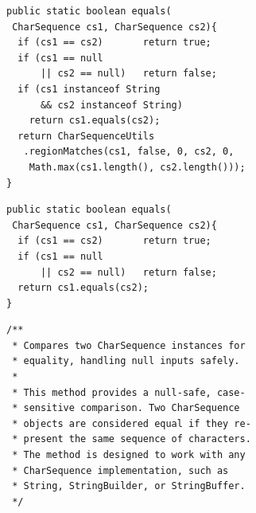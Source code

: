 \documentclass[acmsmall]{acmart}
\newcommand{\hlRange}[2]{%
  \ifnum\value{lstnumber}<#1 \else
  \ifnum\value{lstnumber}>#2 \else
    \color{bvfHL}%
  \fi\fi
}
\begin{document}
\begin{figure}[htbp!]
\vspace{-0.6em}
\centering
\begin{minipage}{1.00\textwidth}

\begin{minipage}[t]{0.333\linewidth}
\begin{tcolorbox}[fixedbox, title=Bug-free method,
                  equal height group=row1]
\begin{lstlisting}[style=codeTiny,
    linebackgroundcolor={\hlRange{6}{11}}]
public static boolean equals(
 CharSequence cs1, CharSequence cs2){
  if (cs1 == cs2)       return true;
  if (cs1 == null
      || cs2 == null)   return false;
  if (cs1 instanceof String
      && cs2 instanceof String)
    return cs1.equals(cs2);
  return CharSequenceUtils
   .regionMatches(cs1, false, 0, cs2, 0, 
    Math.max(cs1.length(), cs2.length()));
}
\end{lstlisting}
\end{tcolorbox}
\end{minipage}%
\hfill
\begin{minipage}[t]{0.310\linewidth}
\begin{tcolorbox}[buggybox, title=Buggy method,
                  equal height group=row1]
\begin{lstlisting}[style=codeTiny,
    linebackgroundcolor={\hlRange{6}{6}}]
public static boolean equals(
 CharSequence cs1, CharSequence cs2){
  if (cs1 == cs2)       return true;
  if (cs1 == null
      || cs2 == null)   return false;
  return cs1.equals(cs2);
}
\end{lstlisting}
\end{tcolorbox}
\end{minipage}%
\hfill
\begin{minipage}[t]{0.349\linewidth}
\begin{tcolorbox}[docbox, title=Docstring generated from buggy method,
                  equal height group=row1]
\begin{lstlisting}[style=codeTiny]
/**
 * Compares two CharSequence instances for
 * equality, handling null inputs safely.
 *
 * This method provides a null-safe, case-
 * sensitive comparison. Two CharSequence
 * objects are considered equal if they re-
 * present the same sequence of characters.
 * The method is designed to work with any
 * CharSequence implementation, such as
 * String, StringBuilder, or StringBuffer.
 */
\end{lstlisting}
\end{tcolorbox}
\end{minipage}


\end{minipage}
\end{figure}
\end{document}
